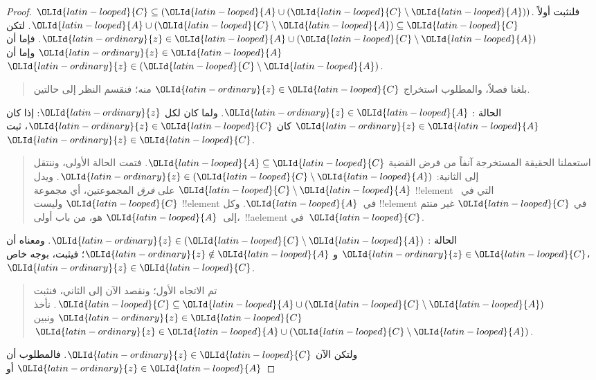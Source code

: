 \documentclass[../../../include/open-logic-section]{subfiles}
\begin{document}
\begin{proof}
  $\OLId{latin-looped}{C} \subseteq (\OLId{latin-looped}{A} \cup (\OLId{latin-looped}{C} \setminus \OLId{latin-looped}{A}))$. فلنثبت أولاً
  $\OLId{latin-looped}{A} \cup (\OLId{latin-looped}{C} \setminus \OLId{latin-looped}{A}) \subseteq \OLId{latin-looped}{C}$. لتكن
  $\OLId{latin-ordinary}{z} \in \OLId{latin-looped}{A} \cup (\OLId{latin-looped}{C} \setminus \OLId{latin-looped}{A})$. فإما أن $\OLId{latin-ordinary}{z} \in \OLId{latin-looped}{A}$ وإما أن
  $\OLId{latin-ordinary}{z} \in (\OLId{latin-looped}{C} \setminus \OLId{latin-looped}{A})$.
  \begin{quote}
    بلغنا فصلاً، والمطلوب استخراج $\OLId{latin-ordinary}{z} \in \OLId{latin-looped}{C}$ منه؛ فنقسم النظر إلى
    حالتين.
  \end{quote}
  الحالة : $\OLId{latin-ordinary}{z} \in \OLId{latin-looped}{A}$. ولما كان لكل $\OLId{latin-ordinary}{z}$: إذا كان $\OLId{latin-ordinary}{z} \in \OLId{latin-looped}{A}$ كان
  $\OLId{latin-ordinary}{z} \in \OLId{latin-looped}{C}$، ثبت $\OLId{latin-ordinary}{z} \in \OLId{latin-looped}{C}$.
  \begin{quote}
    استعملنا الحقيقة المستخرجة آنفاً من فرض القضية
    $\OLId{latin-looped}{A} \subseteq \OLId{latin-looped}{C}$. فتمت الحالة الأولى، وننتقل إلى الثانية:
    $\OLId{latin-ordinary}{z} \in (\OLId{latin-looped}{C} \setminus \OLId{latin-looped}{A})$. ويدل $\OLId{latin-looped}{C} \setminus \OLId{latin-looped}{A}$ على \emph{فرق}
    المجموعتين، أي مجموعة !!{element} التي في~$\OLId{latin-looped}{C}$ وليست
    !!{element} في~$\OLId{latin-looped}{A}$. وكل !!{element} في $\OLId{latin-looped}{C}$ غير منتم إلى~$\OLId{latin-looped}{A}$ هو،
    من باب أولى،~!!a{element} في~$\OLId{latin-looped}{C}$.
  \end{quote}
  الحالة : $\OLId{latin-ordinary}{z} \in (\OLId{latin-looped}{C} \setminus \OLId{latin-looped}{A})$. ومعناه أن $\OLId{latin-ordinary}{z} \in \OLId{latin-looped}{C}$ و
  $\OLId{latin-ordinary}{z} \notin \OLId{latin-looped}{A}$؛ فيثبت، بوجه خاص،~$\OLId{latin-ordinary}{z} \in \OLId{latin-looped}{C}$.
  \begin{quote}
    تم الاتجاه الأول؛ ونقصد الآن إلى الثاني، فنثبت
    $\OLId{latin-looped}{C} \subseteq \OLId{latin-looped}{A} \cup (\OLId{latin-looped}{C} \setminus \OLId{latin-looped}{A})$. نأخذ $\OLId{latin-ordinary}{z} \in \OLId{latin-looped}{C}$ ونبين
    $\OLId{latin-ordinary}{z} \in \OLId{latin-looped}{A} \cup (\OLId{latin-looped}{C} \setminus \OLId{latin-looped}{A})$.
  \end{quote}
  ولتكن الآن $\OLId{latin-ordinary}{z} \in \OLId{latin-looped}{C}$. فالمطلوب أن $\OLId{latin-ordinary}{z} \in \OLId{latin-looped}{A}$ أو

\end{proof}
\end{document}
